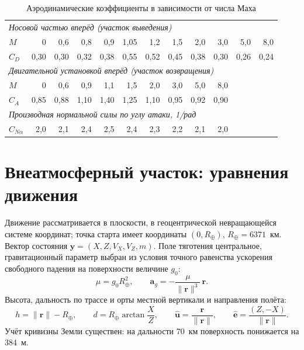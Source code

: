 \documentclass[11pt,a4paper]{article}
\newcommand{\vect}[1]{\bm{#1}}
\begin{document}
\begin{table}[htb]
\centering
\caption{Аэродинамические коэффициенты в зависимости от числа Маха}
\label{tab:cd}
\begin{tabular}{lrrrrrrrrrrr}
\toprule
\multicolumn{12}{l}{\emph{Носовой частью вперёд (участок выведения)}}\\
$M$ & 0 & 0{,}6 & 0{,}8 & 0{,}9 & 1{,}05 & 1{,}2 & 1{,}5 & 2{,}0 & 3{,}0 & 5{,}0 & 8{,}0 \\
$C_D$ & 0{,}30 & 0{,}30 & 0{,}32 & 0{,}38 & 0{,}55 & 0{,}52 & 0{,}45 & 0{,}38 & 0{,}30 & 0{,}26 & 0{,}24 \\
\midrule
\multicolumn{12}{l}{\emph{Двигательной установкой вперёд (участок возвращения)}}\\
$M$ & 0 & 0{,}6 & 0{,}9 & 1{,}1 & 1{,}5 & 2{,}0 & 3{,}0 & 5{,}0 & 8{,}0 & & \\
$C_A$ & 0{,}85 & 0{,}88 & 1{,}10 & 1{,}40 & 1{,}25 & 1{,}10 & 0{,}95 & 0{,}92 & 0{,}90 & & \\
\midrule
\multicolumn{12}{l}{\emph{Производная нормальной силы по углу атаки, 1/рад}}\\
$C_{N\alpha}$ & 2{,}0 & 2{,}1 & 2{,}4 & 2{,}5 & 2{,}4 & 2{,}3 & 2{,}2 & 2{,}1 & 2{,}0 & & \\
\bottomrule
\end{tabular}
\end{table}

\section{Внеатмосферный участок: уравнения движения}

Движение рассматривается в плоскости, в геоцентрической невращающейся системе
координат; точка старта имеет координаты $(0,R_\oplus)$, $R_\oplus=6371$~км.
Вектор состояния $\vect{y}=(X,Z,V_X,V_Z,m)$. Поле тяготения центральное,
гравитационный параметр выбран из условия точного равенства ускорения
свободного падения на поверхности величине $g_0$:
\begin{equation}
\mu = g_0 R_\oplus^2,
\qquad
\vect{a}_g = -\frac{\mu}{\lVert\vect{r}\rVert^3}\,\vect{r} .
\end{equation}
Высота, дальность по трассе и орты местной вертикали и направления полёта:
\begin{equation}
h = \lVert\vect{r}\rVert - R_\oplus,
\qquad
d = R_\oplus \arctan\frac{X}{Z},
\qquad
\hat{\vect{u}} = \frac{\vect{r}}{\lVert\vect{r}\rVert},
\qquad
\hat{\vect{e}} = \frac{(Z,-X)}{\lVert\vect{r}\rVert} .
\end{equation}
Учёт кривизны Земли существен: на дальности 70~км поверхность понижается на
384~м.
\end{document}
